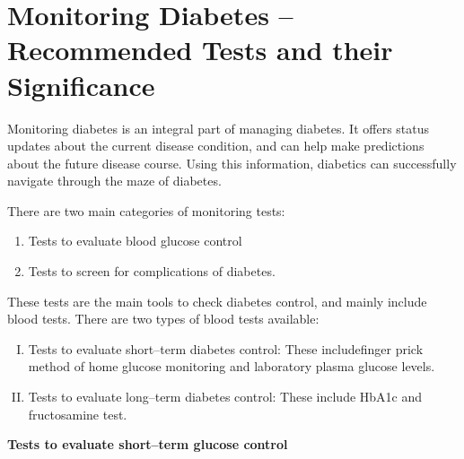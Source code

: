 \newpage

\rhead[\small \em \leftmark]{\small\thepage}
\chapter{Monitoring Diabetes – Recommended Tests and their Significance}\label{chap24}

Monitoring diabetes is an integral part of managing diabetes. It offers status updates about the current disease condition, and can help make predictions about the future disease course. Using this information, diabetics can successfully navigate through the maze of diabetes.

\noindent There are two main categories of monitoring tests:

\vspace{-\topsep}
\begin{enumerate}
\itemsep=0pt
\item Tests to evaluate blood glucose control
\item Tests to screen for complications of diabetes.
\end{enumerate}
\vspace{-\topsep}


These tests are the main tools to check diabetes control, and mainly include blood tests. There are two types of blood tests available:

\vspace{-\topsep}
\begin{enumerate}[I.]
\itemsep=0pt
\item Tests to evaluate short–term diabetes control: These include\break finger prick method of home glucose monitoring and laboratory plasma glucose levels.
\item Tests to evaluate long–term diabetes control: These include HbA1c and fructosamine test.
\end{enumerate}
\vspace{-\topsep}

\noindent\textbf{Tests to evaluate short–term glucose control}

